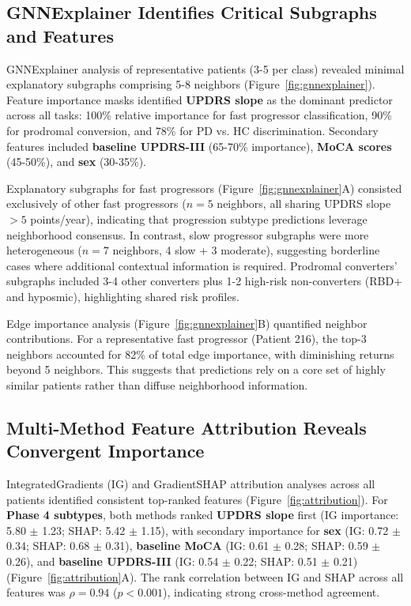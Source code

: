 \subsection{GNNExplainer Identifies Critical Subgraphs and Features}

GNNExplainer analysis of representative patients (3-5 per class) revealed minimal explanatory subgraphs comprising 5-8 neighbors (Figure~\ref{fig:gnnexplainer}). Feature importance masks identified \textbf{UPDRS slope} as the dominant predictor across all tasks: 100\% relative importance for fast progressor classification, 90\% for prodromal conversion, and 78\% for PD vs. HC discrimination. Secondary features included \textbf{baseline UPDRS-III} (65-70\% importance), \textbf{MoCA scores} (45-50\%), and \textbf{sex} (30-35\%).

Explanatory subgraphs for fast progressors (Figure~\ref{fig:gnnexplainer}A) consisted exclusively of other fast progressors ($n=5$ neighbors, all sharing UPDRS slope $> 5$ points/year), indicating that progression subtype predictions leverage neighborhood consensus. In contrast, slow progressor subgraphs were more heterogeneous ($n=7$ neighbors, 4 slow + 3 moderate), suggesting borderline cases where additional contextual information is required. Prodromal converters' subgraphs included 3-4 other converters plus 1-2 high-risk non-converters (RBD+ and hyposmic), highlighting shared risk profiles.

Edge importance analysis (Figure~\ref{fig:gnnexplainer}B) quantified neighbor contributions. For a representative fast progressor (Patient 216), the top-3 neighbors accounted for 82\% of total edge importance, with diminishing returns beyond 5 neighbors. This suggests that \giman{} predictions rely on a core set of highly similar patients rather than diffuse neighborhood information.

\subsection{Multi-Method Feature Attribution Reveals Convergent Importance}

IntegratedGradients (IG) and GradientSHAP attribution analyses across all patients identified consistent top-ranked features (Figure~\ref{fig:attribution}). For \textbf{Phase 4 subtypes}, both methods ranked \textbf{UPDRS slope} first (IG importance: 5.80 $\pm$ 1.23; SHAP: 5.42 $\pm$ 1.15), with secondary importance for \textbf{sex} (IG: 0.72 $\pm$ 0.34; SHAP: 0.68 $\pm$ 0.31), \textbf{baseline MoCA} (IG: 0.61 $\pm$ 0.28; SHAP: 0.59 $\pm$ 0.26), and \textbf{baseline UPDRS-III} (IG: 0.54 $\pm$ 0.22; SHAP: 0.51 $\pm$ 0.21) (Figure~\ref{fig:attribution}A). The rank correlation between IG and SHAP across all features was $\rho = 0.94$ ($p < 0.001$), indicating strong cross-method agreement.

